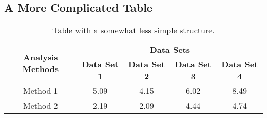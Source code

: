 \subsection{A More Complicated Table}

\begin{table}[ht]
	\centering
	\begin{tabular}{c c c c c}
		\toprule
		\multirow{2}{*}{\textbf{Analysis Methods}} &
		\multicolumn{4}{c}{\textbf{Data Sets}} \\
		& 
		\textbf{Data Set 1} & 
		\textbf{Data Set 2} & 
		\textbf{Data Set 3} & 
		\textbf{Data Set 4} \\
		\midrule
		Method 1	& \num{5.09}	& \num{4.15}	& \num{6.02}	& \num{8.49}		\\ 
		Method 2	& \num{2.19}	& \num{2.09}	& \num{4.44}	& \num{4.74}		\\ 
		\bottomrule
	\end{tabular}
	\caption{Table with a somewhat less simple structure.}
	\label{tab2:tau_form_resolution_mean}
\end{table}
